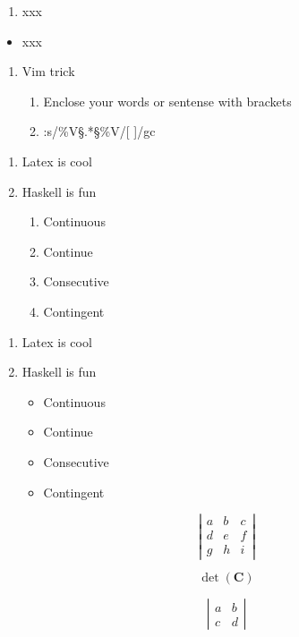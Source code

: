 \documentclass{article}
\begin{document}
\begin{enumerate}
\item xxx
\end{enumerate} 

\begin{itemize}
\item xxx
\end{itemize} 

\begin{enumerate}
    \item Vim trick 
    \begin{enumerate}
        \item Enclose your words or sentense with brackets 
        \item :s/\%V\S.*\S\%V/[ \0 ]/gc 
    \end{enumerate}
\end{enumerate}

\begin{enumerate}
    \item Latex is cool
    \item Haskell is fun 
    \begin{enumerate}
    \item Continuous 
    \item Continue 
    \item Consecutive 
    \item Contingent 
    \end{enumerate} 
\end{enumerate} 

\begin{enumerate}
    \item Latex is cool
    \item Haskell is fun 
    \begin{itemize}
    \item Continuous 
    \item Continue 
    \item Consecutive 
    \item Contingent 
    \end{itemize} 
\end{enumerate} 

\[      
    \left| \begin{array}{ccc}
    a & b & c \\
    d & e & f \\
    g & h & i \end{array} \right| 
\]
 

\[  \det (\mathbf{C})   \]

\[ \left| \begin{array}{cc}
a & b \\
c & d \end{array} \right| \] 
\end{document}
